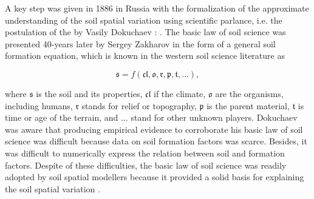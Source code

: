 A key step was given in 1886 in Russia with the formalization of the approximate understanding of the soil 
spatial variation using scientific parlance, i.e. the postulation of the  by 
Vasily Dokuchaev \cite{Florinsky2012}: . The basic law of soil science was presented 40-years later by Sergey Zakharov in the form of a 
general soil formation equation, which is known in the western soil science literature as \cite{Jenny1941, 
Florinsky2012}

\begin{equation}
\mathfrak{s} = f(\mathfrak{cl}, \mathfrak{o}, \mathfrak{r}, \mathfrak{p}, \mathfrak{t}, \mathfrak{\ldots}),
\end{equation}\label{eqn:chap02-clorpt}

\noindent where $\mathfrak{s}$ is the soil and its properties, $\mathfrak{cl}$ if the climate, $\mathfrak{o}$ 
are the organisms, including humans, $\mathfrak{r}$ stands for relief or topography, $\mathfrak{p}$ is the 
parent material, $\mathfrak{t}$ is time or age of the terrain, and $\mathfrak{\ldots}$ stand for other unknown 
players. Dokuchaev was aware that producing empirical evidence to corroborate his basic law of soil science was 
difficult because data on soil formation factors was scarce. Besides, it was difficult to numerically express 
the relation between soil and formation factors. Despite of these difficulties, the basic law of soil science 
was readily adopted by soil spatial modellers because it provided a solid basis for explaining the soil spatial 
variation \cite{Smith1986}.

